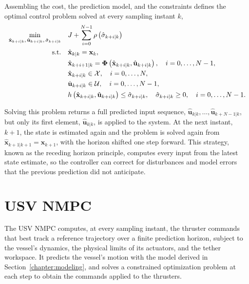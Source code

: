 Assembling the cost, the prediction model, and the constraints defines the optimal control problem solved at every sampling instant $k$,
\begin{align}
    \min_{\hat{\mathbf{x}}_{k+i|k}, \, \hat{\mathbf{u}}_{k+i|k}, \, \hat{\sigma}_{k+i|k}} \quad & J + \sum_{i=0}^{N-1} \rho\left( \hat{\sigma}_{k+i|k} \right) \label{eq:nmpc_ocp_cost} \\
    \text{s.t.} \quad & \hat{\mathbf{x}}_{k|k} = \mathbf{x}_k, \notag \\
    & \hat{\mathbf{x}}_{k+i+1|k} = \boldsymbol\Phi\left( \hat{\mathbf{x}}_{k+i|k}, \hat{\mathbf{u}}_{k+i|k} \right), \quad i = 0, \dots, N-1, \notag \\
    & \hat{\mathbf{x}}_{k+i|k} \in \mathcal{X}, \quad i = 0, \dots, N, \notag \\
    & \hat{\mathbf{u}}_{k+i|k} \in \mathcal{U}, \quad i = 0, \dots, N-1, \notag \\
    & h\left( \hat{\mathbf{x}}_{k+i|k}, \hat{\mathbf{u}}_{k+i|k} \right) \le \hat{\sigma}_{k+i|k}, \quad \hat{\sigma}_{k+i|k} \ge 0, \quad i = 0, \dots, N-1. \notag
\end{align}

Solving this problem returns a full predicted input sequence, $\hat{\mathbf{u}}_{k|k}, \dots, \hat{\mathbf{u}}_{k+N-1|k}$, but only its first element, $\hat{\mathbf{u}}_{k|k}$, is applied to the system. At the next instant, $k+1$, the state is estimated again and the problem is solved again from $\hat{\mathbf{x}}_{k+1|k+1} = \mathbf{x}_{k+1}$, with the horizon shifted one step forward. This strategy, known as the receding horizon principle, computes every input from the latest state estimate, so the controller can correct for disturbances and model errors that the previous prediction did not anticipate.


\section{USV NMPC}
\label{sec:ctrl_usv_mpc}

The USV NMPC computes, at every sampling instant, the thruster commands that best track a reference trajectory over a finite prediction horizon, subject to the vessel's dynamics, the physical limits of its actuators, and the tether workspace. It predicts the vessel's motion with the model derived in Section~\ref{chapter:modeling}, and solves a constrained optimization problem at each step to obtain the commands applied to the thrusters.

